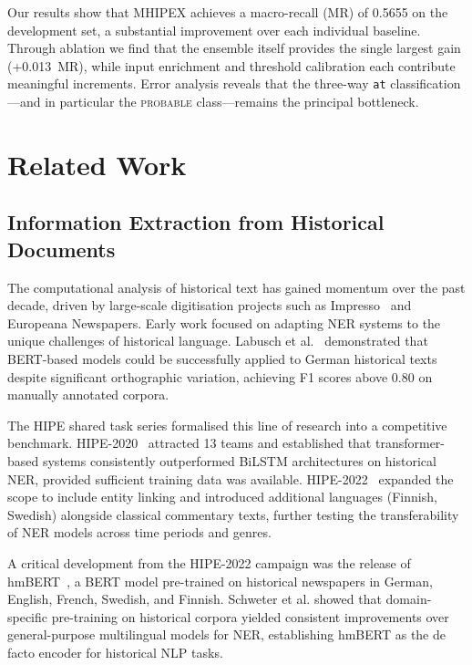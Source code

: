 \documentclass[runningheads]{llncs}
\begin{document}
Our results show that MHIPEX achieves a macro-recall (MR) of 0.5655 on the development set, a substantial improvement over each individual baseline. Through ablation we find that the ensemble itself provides the single largest gain (+0.013~MR), while input enrichment and threshold calibration each contribute meaningful increments. Error analysis reveals that the three-way \texttt{at} classification---and in particular the \textsc{probable} class---remains the principal bottleneck.

\section{Related Work}
\label{sec:related}

\subsection{Information Extraction from Historical Documents}

The computational analysis of historical text has gained momentum over the past decade, driven by large-scale digitisation projects such as Impresso~\cite{romanello2020} and Europeana Newspapers. Early work focused on adapting NER systems to the unique challenges of historical language. Labusch et al.~\cite{labusch2019} demonstrated that BERT-based models could be successfully applied to German historical texts despite significant orthographic variation, achieving F1 scores above 0.80 on manually annotated corpora.

The HIPE shared task series formalised this line of research into a competitive benchmark. HIPE-2020~\cite{ehrmann2020} attracted 13 teams and established that transformer-based systems consistently outperformed BiLSTM architectures on historical NER, provided sufficient training data was available. HIPE-2022~\cite{ehrmann2022} expanded the scope to include entity linking and introduced additional languages (Finnish, Swedish) alongside classical commentary texts, further testing the transferability of NER models across time periods and genres.

A critical development from the HIPE-2022 campaign was the release of hmBERT~\cite{schweter2022}, a BERT model pre-trained on historical newspapers in German, English, French, Swedish, and Finnish. Schweter et al. showed that domain-specific pre-training on historical corpora yielded consistent improvements over general-purpose multilingual models for NER, establishing hmBERT as the de facto encoder for historical NLP tasks.
\end{document}
